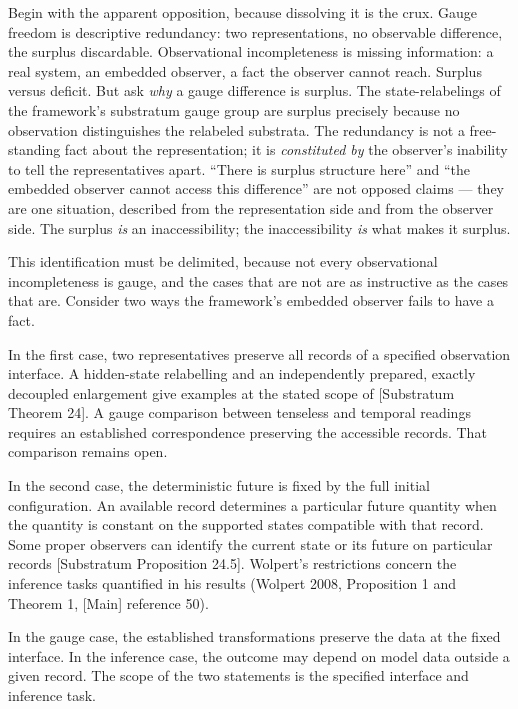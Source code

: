 \documentclass[
]{article}
\begin{document}
Begin with the apparent opposition, because dissolving it is the crux.
Gauge freedom is descriptive redundancy: two representations, no
observable difference, the surplus discardable. Observational
incompleteness is missing information: a real system, an embedded
observer, a fact the observer cannot reach. Surplus versus deficit. But
ask \emph{why} a gauge difference is surplus. The state-relabelings of
the framework's substratum gauge group are surplus precisely because no
observation distinguishes the relabeled substrata. The redundancy is not
a free-standing fact about the representation; it is \emph{constituted
by} the observer's inability to tell the representatives apart. ``There
is surplus structure here'' and ``the embedded observer cannot access
this difference'' are not opposed claims --- they are one situation,
described from the representation side and from the observer side. The
surplus \emph{is} an inaccessibility; the inaccessibility \emph{is} what
makes it surplus.

This identification must be delimited, because not every observational
incompleteness is gauge, and the cases that are not are as instructive
as the cases that are. Consider two ways the framework's embedded
observer fails to have a fact.

In the first case, two representatives preserve all records of a
specified observation interface. A hidden-state relabelling and an
independently prepared, exactly decoupled enlargement give examples at
the stated scope of {[}Substratum Theorem 24{]}. A gauge comparison
between tenseless and temporal readings requires an established
correspondence preserving the accessible records. That comparison
remains open.

In the second case, the deterministic future is fixed by the full
initial configuration. An available record determines a particular
future quantity when the quantity is constant on the supported states
compatible with that record. Some proper observers can identify the
current state or its future on particular records {[}Substratum
Proposition 24.5{]}. Wolpert's restrictions concern the inference tasks
quantified in his results (Wolpert 2008, Proposition 1 and Theorem 1,
{[}Main{]} reference 50).

In the gauge case, the established transformations preserve the data at
the fixed interface. In the inference case, the outcome may depend on
model data outside a given record. The scope of the two statements is
the specified interface and inference task.
\end{document}
